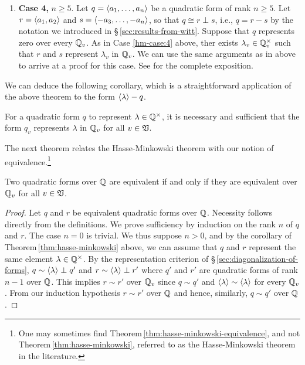 \begin{enumerate}[wide, nosep, label=(\alph*)]
    \item \textbf{Case 4,} \(n \geq 5\). Let \(q = \langle a_1, \dots, a_n \rangle\)
    be a quadratic form of rank \(n \geq 5\). Let \(r = \langle a_1, a_2 \rangle\)
    and \(s = \langle -a_3, \dots, -a_n \rangle\), so that \(q \cong r \perp s\),
    i.e., \(q = r - s\) by the notation we introduced in
    \S\,\ref{sec:results-from-witt}. Suppose that \(q\) represents zero over
    every \(\mathbb{Q}_v\). As in Case \ref{hm-case:4} above, ther exists
    \(\lambda_v \in \mathbb{Q}_v^{\times}\) such that \(r\) and \(s\) represent
    \(\lambda_v\) in \(\mathbb{Q}_v\). We can use the same arguments as in above to arrive at a proof for this case. See \cite[p.~43]{serre2012course} for the complete exposition. 
\end{enumerate}

\medskip

We can deduce the following corollary, which is a straightforward application of
the above theorem to the form \(\langle \lambda \rangle - q\).

\begin{corollary}
    For a quadratic form \(q\) to represent \(\lambda \in \mathbb{Q}^{\times}\),
    it is necessary and sufficient that the form \(q_v\) represents \(\lambda\)
    in \(\mathbb{Q}_v\) for all \(v \in \mathfrak{V}\).
\end{corollary}

The next theorem relates the Hasse-Minkowski theorem with our notion of
equivalence.\footnote{One may sometimes find
Theorem\,\ref{thm:hasse-minkowski-equivalence}, and not
Theorem\,\ref{thm:hasse-minkowski}, referred to as the Hasse-Minkowski theorem
in the literature.}

\begin{theoremx}\label{thm:hasse-minkowski-equivalence} Two quadratic forms over
    \(\mathbb{Q}\) are equivalent if and only if they are equivalent over
    \(\mathbb{Q}_v\) for all \(v \in \mathfrak{V}\).
\end{theoremx}

\begin{proof}
    Let \(q\) and \(r\) be equivalent quadratic forms over \(\mathbb{Q}\).
    Necessity follows directly from the definitions. We prove sufficiency by
    induction on the rank \(n\) of \(q\) and \(r\). The case \(n = 0\) is
    trivial. We thus suppose \(n > 0\), and by the corollary of
    Theorem\,\ref{thm:hasse-minkowski} above, we can assume that \(q\) and \(r\)
    represent the same element \(\lambda \in \mathbb{Q}^{\times}\). By the
    representation criterion of \S\,\ref{sec:diagonalization-of-forms}, \(q \sim
    \langle \lambda \rangle \perp q'\) and \(r \sim \langle \lambda \rangle \perp r'\)
    where \(q'\) and \(r'\) are quadratic forms of rank \(n - 1\) over
    \(\mathbb{Q}\). This implies \(r \sim r'\) over \(\mathbb{Q}_v\) since \(q
    \sim q'\) and \(\langle \lambda \rangle \sim \langle \lambda \rangle\) for every
    \(\mathbb{Q}_v\). From our induction hypothesis \(r \sim r'\) over
    \(\mathbb{Q}\) and hence, similarly, \(q \sim q'\) over \(\mathbb{Q}\).
\end{proof}

